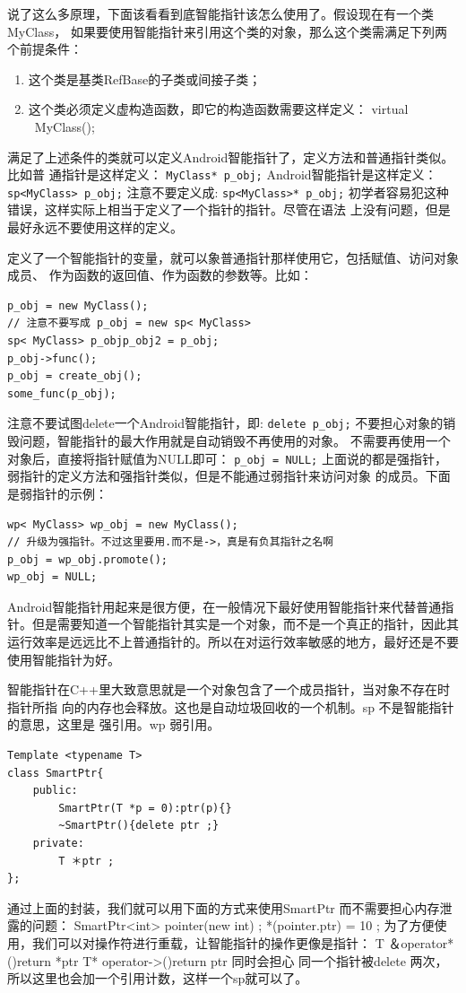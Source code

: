 \documentclass[a4paper,11pt]{article}
\begin{document}
说了这么多原理，下面该看看到底智能指针该怎么使用了。假设现在有一个类MyClass，
如果要使用智能指针来引用这个类的对象，那么这个类需满足下列两个前提条件：
\begin{enumerate}
    \item 这个类是基类RefBase的子类或间接子类；
    \item 这个类必须定义虚构造函数，即它的构造函数需要这样定义：
virtual ~MyClass();
\end{enumerate}
满足了上述条件的类就可以定义Android智能指针了，定义方法和普通指针类似。比如普
通指针是这样定义：
\lstinline{MyClass* p_obj;}
Android智能指针是这样定义：
\lstinline{sp<MyClass> p_obj;}
注意不要定义成:
\lstinline{sp<MyClass>* p_obj;}
初学者容易犯这种错误，这样实际上相当于定义了一个指针的指针。尽管在语法
上没有问题，但是最好永远不要使用这样的定义。

定义了一个智能指针的变量，就可以象普通指针那样使用它，包括赋值、访问对象成员、
作为函数的返回值、作为函数的参数等。比如：
\begin{lstlisting}
p_obj = new MyClass();
// 注意不要写成 p_obj = new sp< MyClass>
sp< MyClass> p_objp_obj2 = p_obj;
p_obj->func();
p_obj = create_obj();
some_func(p_obj);
\end{lstlisting}
注意不要试图delete一个Android智能指针，即:
\lstinline|delete p_obj;|
不要担心对象的销毁问题，智能指针的最大作用就是自动销毁不再使用的对象。
不需要再使用一个对象后，直接将指针赋值为NULL即可：
\lstinline|p_obj = NULL;|
上面说的都是强指针，弱指针的定义方法和强指针类似，但是不能通过弱指针来访问对象
的成员。下面是弱指针的示例：
\begin{lstlisting}
wp< MyClass> wp_obj = new MyClass();
// 升级为强指针。不过这里要用.而不是->，真是有负其指针之名啊
p_obj = wp_obj.promote();
wp_obj = NULL;
\end{lstlisting}

Android智能指针用起来是很方便，在一般情况下最好使用智能指针来代替普通指针。但是需要知道一个智能指针其实是一个对象，而不是一个真正的指针，因此其运行效率是远远比不上普通指针的。所以在对运行效率敏感的地方，最好还是不要使用智能指针为好。

智能指针在C++里大致意思就是一个对象包含了一个成员指针，当对象不存在时指针所指
向的内存也会释放。这也是自动垃圾回收的一个机制。sp 不是智能指针的意思，这里是
强引用。wp 弱引用。

\begin{lstlisting}
Template <typename T>
class SmartPtr{
    public:
        SmartPtr(T *p = 0):ptr(p){}
        ~SmartPtr(){delete ptr ;}
    private:
        T ＊ptr ;
};
\end{lstlisting}
通过上面的封装，我们就可以用下面的方式来使用SmartPtr 而不需要担心内存泄露的问题：
SmartPtr<int> pointer(new int) ;
*(pointer.ptr) = 10 ;
为了方便使用，我们可以对操作符进行重载，让智能指针的操作更像是指针：
T ＆operator*(){return *ptr}
T* operator->(){return ptr}
同时会担心 同一个指针被delete 两次，所以这里也会加一个引用计数，这样一个sp就可以了。
\end{document}
